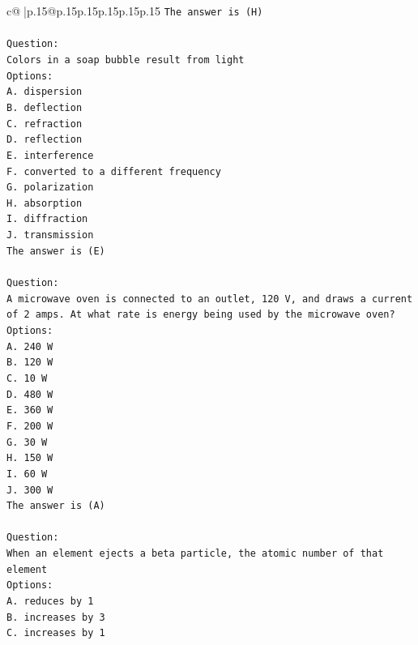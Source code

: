\documentclass{article}
\begin{document}
{\begin{supertabular}{c@{$\;$}|p{.15\linewidth}@{}p{.15\linewidth}p{.15\linewidth}p{.15\linewidth}p{.15\linewidth}p{.15\linewidth}}
{{{\texttt{The answer is (H)} \\
\\ 
\texttt{Question:} \\
\texttt{Colors in a soap bubble result from light} \\
\texttt{Options:} \\
\texttt{A. dispersion} \\
\texttt{B. deflection} \\
\texttt{C. refraction} \\
\texttt{D. reflection} \\
\texttt{E. interference} \\
\texttt{F. converted to a different frequency} \\
\texttt{G. polarization} \\
\texttt{H. absorption} \\
\texttt{I. diffraction} \\
\texttt{J. transmission} \\
\texttt{The answer is (E)} \\
\\ 
\texttt{Question:} \\
\texttt{A microwave oven is connected to an outlet, 120 V, and draws a current of 2 amps. At what rate is energy being used by the microwave oven?} \\
\texttt{Options:} \\
\texttt{A. 240 W} \\
\texttt{B. 120 W} \\
\texttt{C. 10 W} \\
\texttt{D. 480 W} \\
\texttt{E. 360 W} \\
\texttt{F. 200 W} \\
\texttt{G. 30 W} \\
\texttt{H. 150 W} \\
\texttt{I. 60 W} \\
\texttt{J. 300 W} \\
\texttt{The answer is (A)} \\
\\ 
\texttt{Question:} \\
\texttt{When an element ejects a beta particle, the atomic number of that element} \\
\texttt{Options:} \\
\texttt{A. reduces by 1} \\
\texttt{B. increases by 3} \\
\texttt{C. increases by 1} \\
}}}
\end{supertabular}}
\end{document}
